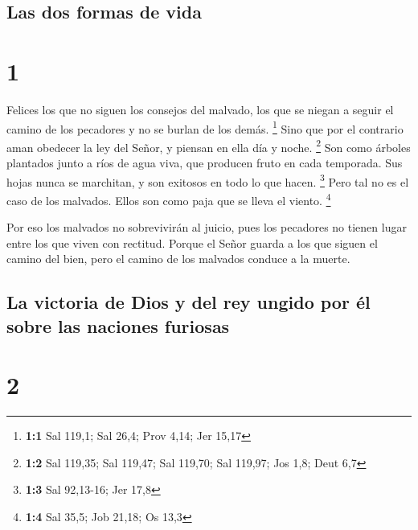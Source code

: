 \hypertarget{las-dos-formas-de-vida}{%
\subsection{Las dos formas de vida}\label{las-dos-formas-de-vida}}

\hypertarget{section}{%
\section{1}\label{section}}

 Felices los que no siguen los consejos del malvado, los que
se niegan a seguir el camino de los pecadores y no se burlan de los
demás. \footnote{\textbf{1:1} Sal 119,1; Sal 26,4; Prov 4,14; Jer 15,17}
 Sino que por el contrario aman obedecer la ley del Señor, y
piensan en ella día y noche. \footnote{\textbf{1:2} Sal 119,35; Sal
  119,47; Sal 119,70; Sal 119,97; Jos 1,8; Deut 6,7}  Son
como árboles plantados junto a ríos de agua viva, que producen fruto en
cada temporada. Sus hojas nunca se marchitan, y son exitosos en todo lo
que hacen. \footnote{\textbf{1:3} Sal 92,13-16; Jer 17,8} 
Pero tal no es el caso de los malvados. Ellos son como paja que se lleva
el viento. \footnote{\textbf{1:4} Sal 35,5; Job 21,18; Os 13,3}

 Por eso los malvados no sobrevivirán al juicio, pues los
pecadores no tienen lugar entre los que viven con rectitud. 
Porque el Señor guarda a los que siguen el camino del bien, pero el
camino de los malvados conduce a la muerte.

\hypertarget{la-victoria-de-dios-y-del-rey-ungido-por-uxe9l-sobre-las-naciones-furiosas}{%
\subsection{La victoria de Dios y del rey ungido por él sobre las
naciones
furiosas}\label{la-victoria-de-dios-y-del-rey-ungido-por-uxe9l-sobre-las-naciones-furiosas}}

\hypertarget{section-1}{%
\section{2}\label{section-1}}

